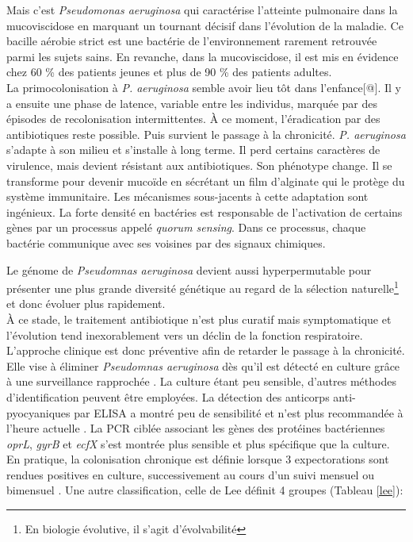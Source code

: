\documentclass[12pt,a4paper]{article}
\begin{document}
Mais c’est \textit{Pseudomonas aeruginosa} qui caractérise l’atteinte pulmonaire dans la mucoviscidose en marquant un tournant décisif dans l’évolution de la maladie. Ce bacille aérobie strict est une bactérie de l'environnement rarement retrouvée parmi les sujets sains\cite{Plesiat}. En revanche, dans la mucoviscidose, il est mis en évidence\cite{LeBourgeois} chez 60 \% des patients jeunes et plus de 90 \% des patients adultes.\\
La primocolonisation à \textit{P. aeruginosa} semble avoir lieu tôt dans l’enfance[@]. Il y a ensuite une phase de latence, variable entre les individus, marquée par des épisodes de recolonisation intermittentes. À ce moment, l’éradication par des antibiotiques reste possible.
Puis survient le passage à la chronicité. \textit{P. aeruginosa} s'adapte à son milieu et s’installe à long terme. Il perd certains caractères de virulence, mais devient résistant aux antibiotiques\cite{LeBourgeois}. Son phénotype change. Il se transforme pour devenir mucoïde en sécrétant un film d’alginate qui le protège du système immunitaire. Les mécanismes sous-jacents à cette adaptation sont ingénieux. La forte densité en bactéries est responsable de l’activation de certains gènes par un processus appelé \textit{quorum sensing}\cite{Ruimy2004}. Dans ce processus, chaque bactérie communique avec ses voisines par des signaux chimiques.

Le génome de \textit{Pseudomnas aeruginosa} devient aussi hyperpermutable\cite{Davies} pour présenter une plus grande diversité génétique au regard de la sélection naturelle\footnote{En biologie évolutive, il s'agit d'évolvabilité} et donc évoluer plus rapidement. \\
À ce stade, le traitement antibiotique n’est plus curatif mais symptomatique et l'évolution tend inexorablement vers un déclin de la fonction respiratoire. \\
L'approche clinique est donc préventive afin de retarder le passage à la chronicité. Elle vise à éliminer \textit{Pseudomnas aeruginosa} dès qu'il est détecté en culture grâce à une surveillance rapprochée \cite{LeBourgeois}. La culture étant peu sensible, d’autres méthodes d'identification peuvent être employées. La détection des anticorps anti-pyocyaniques par ELISA a montré peu de sensibilité et n'est plus recommandée à l'heure actuelle \cite{Plesiat}.
La PCR ciblée associant les gènes des protéines bactériennes \textit{oprL}, \textit{gyrB} et \textit{ecfX} s’est montrée plus sensible et plus spécifique que la culture\cite{LeGall}. \\
En pratique, la colonisation chronique est définie lorsque 3 expectorations sont rendues positives en culture, successivement au cours d’un suivi mensuel ou bimensuel \cite{LeBourgeois}.
Une autre classification, celle de Lee\cite{Lee2003} définit 4 groupes (Tableau \ref{lee}):
\end{document}
